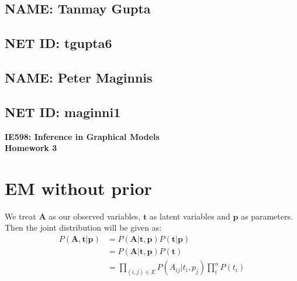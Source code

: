 \documentclass[12pt,onecolumn,letterpaper]{article}
\begin{document}
\begin{minipage}{0.5\textwidth}
\begin{flushleft}
    \subsection*{NAME: Tanmay Gupta}
\end{flushleft}
\end{minipage}
\hfill
\begin{minipage}{0.5\textwidth}
\begin{flushright}
    \subsection*{NET ID: tgupta6}
\end{flushright}
\end{minipage}

\begin{minipage}{0.5\textwidth}
\begin{flushleft}
    \subsection*{NAME: Peter Maginnis}
\end{flushleft}
\end{minipage}
\hfill
\begin{minipage}{0.5\textwidth}
\begin{flushright}
    \subsection*{NET ID: maginni1}
\end{flushright}
\end{minipage}\begin{center}
    \Large\textbf{IE598: Inference in Graphical Models}\\
    \textbf{Homework 3}
\end{center}

\section*{EM without prior}
We treat $\textbf{A}$ as our observed variables, $\textbf{t}$ as latent variables and $\textbf{p}$ as parameters. Then the joint distribution will be given as:
\begin{align*}
P(\textbf{A},\textbf{t}|\textbf{p}) &= P(\textbf{A}|\textbf{t},\textbf{p})P(\textbf{t}|\textbf{p}) \\
&= P(\textbf{A}|\textbf{t},\textbf{p})P(\textbf{t}) \tag{Since true labels are independent of worker abilities} \\
&=\prod_{(i,j)\in E}P(A_{ij}|t_i,p_j)\prod_{i}^{n}P(t_i) \\
\end{align*}
\end{document}
